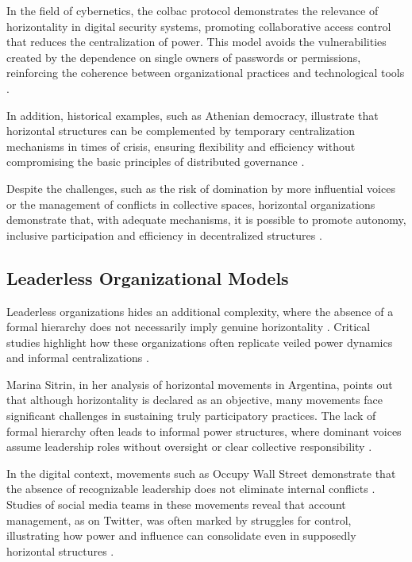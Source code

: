 In the field of cybernetics, the \gls{colbac} protocol demonstrates the relevance of
horizontality in digital security systems, promoting collaborative access
control that reduces the centralization of power. This model avoids the
vulnerabilities created by the dependence on single owners of passwords or
permissions, reinforcing the coherence between organizational practices and
technological tools \cite{Colbac}.

In addition, historical examples, such as Athenian democracy, illustrate that
horizontal structures can be complemented by temporary centralization mechanisms
in times of crisis, ensuring flexibility and efficiency without compromising the
basic principles of distributed governance \cite{AthenianDemocracyABrief}.

Despite the challenges, such as the risk of domination by more influential
voices or the management of conflicts in collective spaces, horizontal
organizations demonstrate that, with adequate mechanisms, it is possible to
promote autonomy, inclusive participation and efficiency in decentralized
structures \cite{SocialMediaTeamsAsDigitalVanguards}.

\subsection{Leaderless Organizational Models}
\label{subsec:leaderless_organizational_models}

Leaderless organizations hides an additional complexity, where
the absence of a formal hierarchy does not necessarily imply genuine
horizontality \cite{SocialMediaTeamsAsDigitalVanguards}. Critical studies
highlight how these organizations often replicate veiled power dynamics and
informal centralizations \cite{SocialMediaTeamsAsDigitalVanguards,
EverydayRevolutions}.

Marina Sitrin, in her analysis of horizontal movements in Argentina, points out
that although horizontality is declared as an objective, many movements face
significant challenges in sustaining truly participatory practices. The lack of
formal hierarchy often leads to informal power structures, where dominant voices
assume leadership roles without oversight or clear collective responsibility
\cite{EverydayRevolutions}.

In the digital context, movements such as Occupy Wall Street demonstrate that
the absence of recognizable leadership does not eliminate internal conflicts
\cite{SocialMediaTeamsAsDigitalVanguards}. Studies of social media teams in
these movements reveal that account management, as on Twitter, was often marked
by struggles for control, illustrating how power and influence can consolidate
even in supposedly horizontal structures
\cite{SocialMediaTeamsAsDigitalVanguards}.

